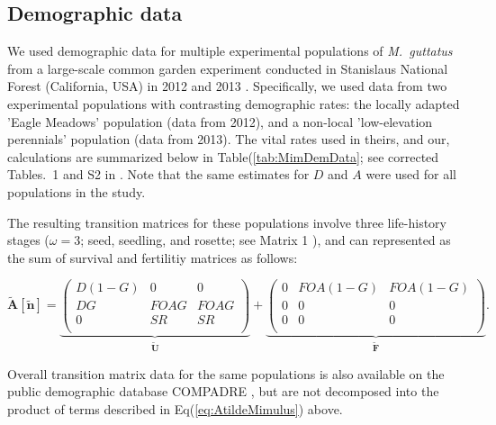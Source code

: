 \documentclass[11pt]{article}
\def\mbf#1{\mathbf{#1}}
\begin{document}
\subsection*{Demographic data}

We used demographic data for multiple experimental populations of {\itshape M.~guttatus} from a large-scale common garden experiment conducted in Stanislaus National Forest (California, USA) in 2012 and 2013 \citep{PetersonEtAl2016}. Specifically, we used data from two experimental populations with contrasting demographic rates: the locally adapted 'Eagle Meadows' population (data from 2012), and a non-local 'low-elevation perennials' population (data from 2013). The vital rates used in theirs, and our, calculations are summarized below in Table(\ref{tab:MimDemData}; see corrected Tables.~1 and S2 in \citet{PetersonEtAl2016, PetersonEtAl2017}. Note that the same estimates for $D$ and $A$ were used for all populations in the study. 

The resulting transition matrices for these populations involve three life-history stages ($\omega = 3$; seed, seedling, and rosette; see Matrix 1 \citealt{PetersonEtAl2016}), and can represented as the sum of survival and fertilitiy matrices as follows:

\begin{linenomath*}
\begin{equation} \label{eq:AtildeMimulus}
	\mathbf{\tilde{A}}[\tilde{\mbf{n}}] = 
			\underbrace{\left(
			\begin{array}{ccc}
				D(1 - G) & 0 & 0 \\
				DG & FOAG & FOAG \\
				0 & SR & SR \\
			\end{array} \right)}_{\tilde{\mbf{U}}} +
			\underbrace{\left(
			\begin{array}{ccc}
				0 & FOA(1 - G) & FOA(1 - G) \\
				0 & 0 & 0 \\
				0 & 0 & 0 \\
			\end{array} \right)}_{\tilde{\mbf{F}}}.
\end{equation}
\end{linenomath*}

Overall transition matrix data for the same populations is also available on the public demographic database COMPADRE \citep{CompadreDB2020}, but are not decomposed into the product of terms described in Eq(\ref{eq:AtildeMimulus}) above.
\end{document}
